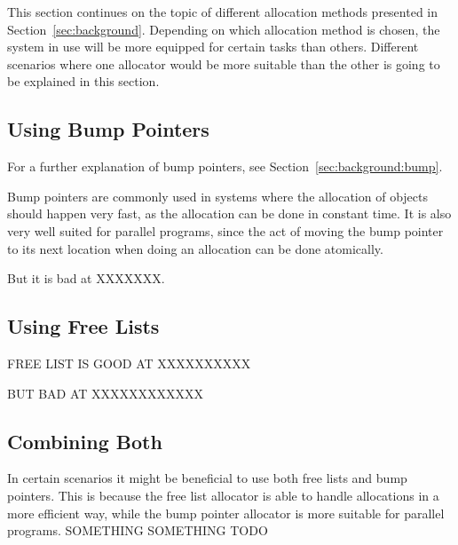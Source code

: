 

This section continues on the topic of different allocation methods presented in Section~\ref{sec:background}. Depending on which allocation method is chosen, the system in use will be more equipped for certain tasks than others. Different scenarios where one allocator would be more suitable than the other is going to be explained in this section.

\subsection{Using Bump Pointers}
For a further explanation of bump pointers, see Section~\ref{sec:background:bump}.

Bump pointers are commonly used in systems where the allocation of objects should happen very fast, as the allocation can be done in constant time. It is also very well suited for parallel programs, since the act of moving the bump pointer to its next location when doing an allocation can be done atomically.

But it is bad at XXXXXXX.

\subsection{Using Free Lists}
FREE LIST IS GOOD AT XXXXXXXXXX

BUT BAD AT XXXXXXXXXXXX

\subsection{Combining Both}
In certain scenarios it might be beneficial to use both free lists and bump pointers. This is because the free list allocator is able to handle allocations in a more efficient way, while the bump pointer allocator is more suitable for parallel programs. SOMETHING SOMETHING TODO